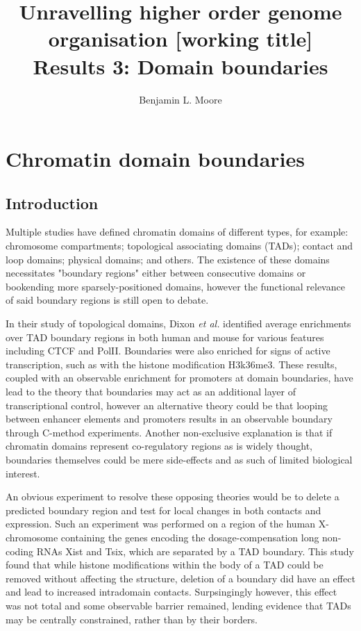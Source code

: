 \documentclass[a4paper,10pt,oneside]{book}
\title{ \vspace{3in} Unravelling higher order genome organisation {\small [working
    title]} \\ \vspace{2em} {\large {\bf Results 3: Domain boundaries}} }
\author{Benjamin L. Moore}
\begin{document}
\maketitle

\chapter{Chromatin domain boundaries}

\section{Introduction}

Multiple studies have defined chromatin domains of different types, for example: chromosome compartments;\cite{Lieberman2009} topological associating domains (TADs);\cite{Dixon2012} contact and loop domains;\cite{Rao2014} physical domains;\cite{Sexton2012, Hou2012} and others.\cite{Filippova2014} The existence of these domains necessitates "boundary regions" either between consecutive domains or bookending more sparsely-positioned domains, however the functional relevance of said boundary regions is still open to debate.

In their study of topological domains, Dixon \emph{et al.} identified average enrichments over TAD boundary regions in both human and mouse for various features including CTCF and PolII.\cite{Dixon2012} Boundaries were also enriched for signs of active transcription, such as with the histone modification H3k36me3. These results, coupled with an observable enrichment for promoters at domain boundaries, have lead to the theory that boundaries may act as an additional layer of transcriptional control,\cite{Sexton2015} however an alternative theory could be that looping between enhancer elements and promoters results in an observable boundary through C-method experiments.\cite{Rao2014} Another non-exclusive explanation is that if chromatin domains represent co-regulatory regions as is widely thought,\cite{LeDily2014, Nora2013, Sexton2015} boundaries themselves could be mere side-effects and as such of limited biological interest.

An obvious experiment to resolve these opposing theories would be to delete a predicted boundary region and test for local changes in both contacts and expression. Such an experiment was performed on a region of the human X-chromosome containing the genes encoding the dosage-compensation long non-coding RNAs Xist and Tsix, which are separated by a TAD boundary.\cite{Nora2012} This study found that while histone modifications within the body of a TAD could be removed without affecting the structure, deletion of a boundary did have an effect and lead to increased intradomain contacts.\cite{Nora2012} Surpsingingly however, this effect was not total and some observable barrier remained, lending evidence that TADs may be centrally constrained, rather than by their borders.\cite{Nora2012} 
\end{document}
